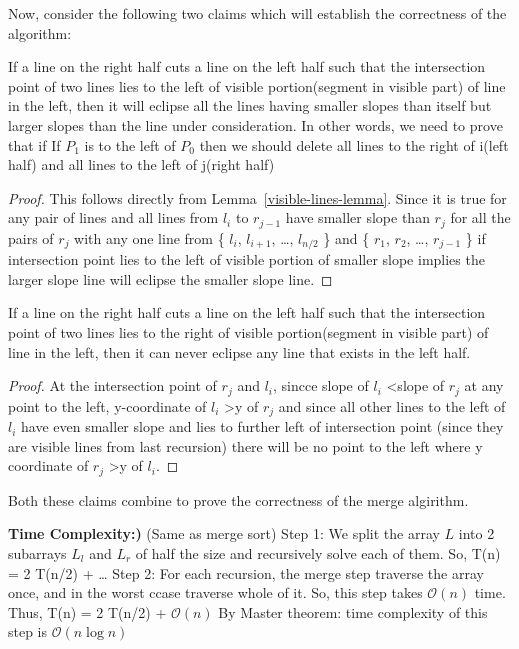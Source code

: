 \documentclass[11pt]{article}
\renewcommand{\O}{\mathcal{O}}
\begin{document}
Now, consider the following two claims which will establish the correctness of the algorithm: \newline

 If a line on the right half cuts a line on the left half such that the intersection point of two lines
lies to the left of visible portion(segment in visible part) of line in the left, then it will eclipse all the lines 
having smaller slopes than itself but larger slopes than the line under consideration. \newline
In other words, we need to prove that if If $P_1$ is to the left of $P_0$ then we should delete all lines
to the right of i(left half) and all lines to the left of j(right half)

\begin{proof}
This follows directly from Lemma~\ref{visible-lines-lemma}. Since it is true for any pair of lines
and all lines from $l_i$ to $r_{j-1}$ have smaller slope than $r_j$ \newline
for all the pairs of 
$r_j$ with any one line from \{ $l_i$, $l_{i+1}$, \dots , $l_{n/2}$ \} and \{ $r_1$, $r_2$, \dots, $r_{j-1}$ \}
if intersection point lies to the left of visible portion of smaller slope implies the larger slope line will
eclipse the smaller slope line.
\end{proof}

 If a line on the right half cuts a line on the left half such that the intersection point of two lines
lies to the right of visible portion(segment in visible part) of line in the left, then it can never eclipse any line that 
exists in the left half. \newline
\begin{proof}
At the intersection point of $r_j$ and $l_i$, sincce slope of $l_i$ \textless slope of $r_j$
at any point to the left, y-coordinate of $l_i$ \textgreater y of $r_j$ \newline
and since all other lines to the left of $l_i$ have even smaller slope 
and lies to further left of intersection point (since they are visible lines from last recursion) \newline
there will be no point to the left where y coordinate of $r_j$ \textgreater y of $l_i$. 
\end{proof}

Both  these claims combine to prove the correctness of the merge algirithm. \newline

{\bf Time Complexity:)} (Same as merge sort) \newline
Step 1: We split the array $L$ into 2 subarrays $L_l$ and $L_r$ of half the size and recursively solve each of them. 
So, T(n) = 2 T(n/2) + \dots \newline
Step 2: For each recursion, the merge step traverse the array once, and in the worst ccase traverse whole of it. \newline
So, this step takes $\O(n)$ time. \newline
Thus, T(n) = 2 T(n/2) + $\O(n)$ \newline
By Master theorem: time complexity of this step is $\O(n\log n)$ \newline
\end{document}
